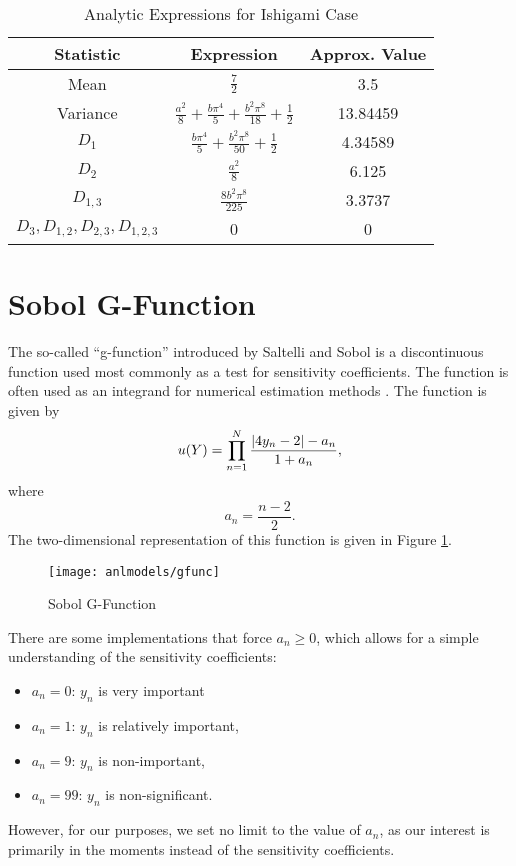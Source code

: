 \begin{table}[H]
  \centering
  \begin{tabular}{c|c|c}
  Statistic & Expression & Approx. Value \\\hline
  Mean & $\frac{7}{2}$ & 3.5 \\
  Variance & $\frac{a^2}{8} + \frac{b\pi^4}{5} + \frac{b^2\pi^8}{18} + \frac{1}{2}$ & 13.84459 \\
  $D_1$ & $\frac{b\pi^4}{5} + \frac{b^2\pi^8}{50} + \frac{1}{2} $ &  4.34589 \\
  $D_2$ & $\frac{a^2}{8}$ & 6.125 \\
  $D_{1,3}$ & $\frac{8b^2\pi^8}{225}$ & 3.3737 \\
  $D_3,D_{1,2},D_{2,3},D_{1,2,3}$ & 0 & 0
  \end{tabular}
  \caption{Analytic Expressions for Ishigami Case}
  \label{tab:ishigami moments}
\end{table}


\section{Sobol G-Function}\label{mod:gfunc}
The so-called ``g-function'' introduced by Saltelli and Sobol \cite{gfunc} is a discontinuous 
function used most commonly as a test for sensitivity coefficients.  The function is often used as an integrand 
for numerical estimation methods \cite{gfuncM}.  
The function is given by
\begin{equation}
  u(Y) = \prod_{n=1}^N \frac{\abs{4y_n-2}-a_n}{1+a_n},
\end{equation}
where
\begin{equation}
  a_n = \frac{n-2}{2}.
\end{equation}
The two-dimensional representation of this function is given in Figure \ref{fig: g func}.
\begin{figure}[htb]
  \centering
  \texttt{[image: anlmodels/gfunc]}
  \caption{Sobol G-Function \cite{sfu}}
  \label{fig: g func}
\end{figure}


There are some implementations \cite{gfuncM} that force $a_n \geq 0$, which allows for a simple
understanding of the sensitivity coefficients: 
\begin{itemize}
  \item $a_n=0$: $y_n$ is very important
  \item $a_n=1$: $y_n$ is relatively important,
  \item $a_n=9$: $y_n$ is non-important,
  \item $a_n=99$: $y_n$ is non-significant.
\end{itemize}
However, for our purposes, we set no limit to the value of $a_n$, as our interest is primarily in the moments
instead of the sensitivity coefficients.


